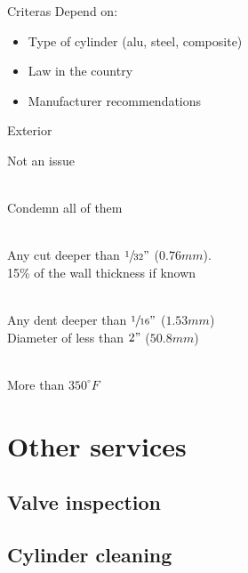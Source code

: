 \documentclass[aspectratio=1610,english,12pt]{beamer}
\begin{document}
\begin{frame}{Criteras}
	Depend on:
	\begin{itemize}
		\item Type of cylinder (alu, steel, composite)
		\item Law in the country
		\item Manufacturer recommendations
	\end{itemize}
\end{frame}

\begin{frame}{Exterior}
	\begin{description}[leftmargin=3em]
		\item [Bow] Not an issue\\~\\
		\item [Bulges] Condemn all of them\\~\\
		\item [Cuts \& digs] Any cut deeper than $\sfrac{1}{32}"$ ($0.76mm$).\\15\% of the wall thickness if known\\~\\
		\item [Dents] Any dent deeper than $\sfrac{1}{16}"$ ($1.53mm$)\\Diameter of 	less than $2"$ ($50.8mm$)\\~\\
		\item [Fire] More than $350^{\circ} F$
	\end{description}
\end{frame}
\section{Other services}
\subsection{Valve inspection}
\subsection{Cylinder cleaning}
\end{document}
